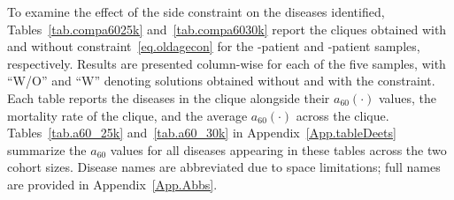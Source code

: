 To examine the effect of the side constraint on the diseases
identified, Tables~\ref{tab.compa6025k} and~\ref{tab.compa6030k}
report the cliques obtained with and without
constraint~\eqref{eq.oldagecon} for the -patient and
-patient samples, respectively. Results are presented
column-wise for each of the five samples, with ``W/O'' and ``W''
denoting solutions obtained without and with the constraint. Each
table reports the diseases in the clique alongside their
$a_{60}(\cdot)$ values, the mortality rate of the clique, and the
average $a_{60}(\cdot)$ across the clique. Tables~\ref{tab.a60_25k}
and~\ref{tab.a60_30k} in Appendix~\ref{App.tableDeets} summarize the
$a_{60}$ values for all diseases appearing in these tables across the
two cohort sizes. Disease names are abbreviated due to space
limitations; full names are provided in Appendix~\ref{App.Abbs}.


